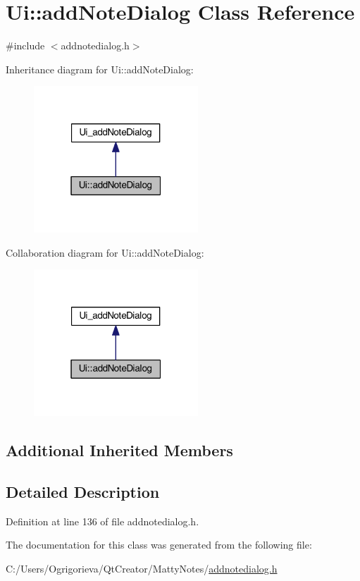 \hypertarget{classUi_1_1addNoteDialog}{}\section{Ui\+:\+:add\+Note\+Dialog Class Reference}
\label{classUi_1_1addNoteDialog}


{\ttfamily \#include $<$addnotedialog.\+h$>$}



Inheritance diagram for Ui\+:\+:add\+Note\+Dialog\+:
\nopagebreak
\begin{figure}[H]
\begin{center}
\leavevmode
\includegraphics[width=175pt]{classUi_1_1addNoteDialog__inherit__graph}
\end{center}
\end{figure}


Collaboration diagram for Ui\+:\+:add\+Note\+Dialog\+:
\nopagebreak
\begin{figure}[H]
\begin{center}
\leavevmode
\includegraphics[width=175pt]{classUi_1_1addNoteDialog__coll__graph}
\end{center}
\end{figure}
\subsection*{Additional Inherited Members}


\subsection{Detailed Description}


Definition at line 136 of file addnotedialog.\+h.



The documentation for this class was generated from the following file\+:\begin{DoxyCompactItemize}
\item 
C\+:/\+Users/\+Ogrigorieva/\+Qt\+Creator/\+Matty\+Notes/\hyperlink{addnotedialog_8h}{addnotedialog.\+h}\end{DoxyCompactItemize}
